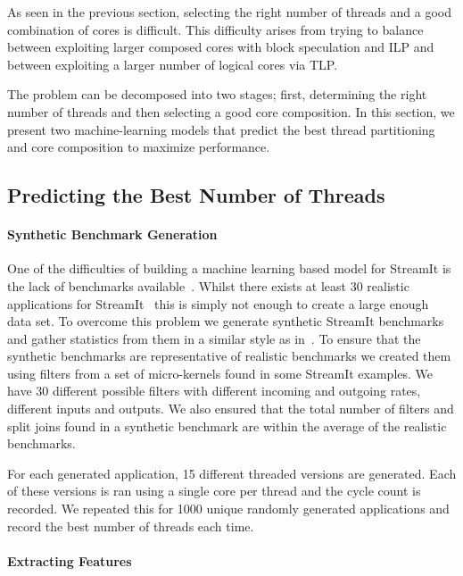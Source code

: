 \vspace{3mm}
As seen in the previous section, selecting the right number of threads and a good combination of cores is difficult.
This difficulty arises from trying to balance between exploiting larger composed cores with block speculation and ILP and between exploiting a larger number of logical cores via TLP.

The problem can be decomposed into two stages; first, determining the right number of threads and then selecting a good core composition.
In this section, we present two machine-learning models that predict the best thread partitioning and core composition to maximize performance.

\subsection{Predicting the Best Number of Threads}

\paragraph{Synthetic Benchmark Generation}

One of the difficulties of building a machine learning based model for StreamIt is the lack of benchmarks available~\cite{wang2013partitionstreamit}.
Whilst there exists at least 30 realistic applications for StreamIt~\cite{theis2010empericalcharstreamit} this is simply not enough to create a large enough data set.
To overcome this problem we generate synthetic StreamIt benchmarks and gather statistics from them in a similar style as in~\cite{wang2013partitionstreamit}.
To ensure that the synthetic benchmarks are representative of realistic benchmarks we created them using filters from a set of micro-kernels found in some StreamIt examples.
We have 30 different possible filters with different incoming and outgoing rates, different inputs and outputs.
We also ensured that the total number of filters and split joins found in a synthetic benchmark are within the average of the realistic benchmarks.

For each generated application, 15 different threaded versions are generated.
Each of these versions is ran using a single core per thread and the cycle count is recorded.
We repeated this for 1000 unique randomly generated applications and record the best number of threads each time.

\paragraph{Extracting Features}

